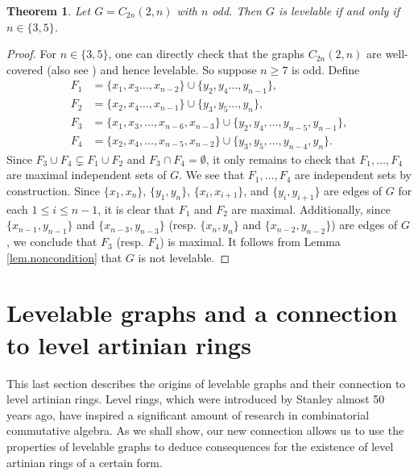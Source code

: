 \documentclass[12pt]{amsart}
\numberwithin{equation}{section}
\newtheorem{theorem}{Theorem}[section]
\theoremstyle{definition}
\newcounter{i} %
\begin{document}
\begin{theorem} \label{thm.circulant2}
Let $G=C_{2n}(2,n)$ with $n$ odd. Then $G$ is levelable if and only if $n \in \{3,5\}$.
\end{theorem}

\begin{proof}
For $n \in \{3,5\}$, one can directly check that the graphs $C_{2n}(2,n)$ are well-covered 
(also 
   see \cite[Theorem 4.3]{BH2011}) and hence levelable. So suppose $n\geq 7$ is odd. Define
    \begin{align*}
        F_1 &= \{x_1,x_3\dots,x_{n-2}\}  \cup \{y_2,y_4\dots, y_{n-1} \},  \\
        F_2 &= \{x_2,x_4\dots,x_{n-1}\}  \cup \{y_3,y_5\dots, y_{n} \}, \\
        F_3 &= \{ x_1,x_3,\dots,x_{n-6}, x_{n-3} \} \cup \{ y_2,y_4,\dots,y_{n-5}, y_{n-1} \}, \\
        F_4 &= \{x_2,x_4,\dots,x_{n-5}, x_{n-2} \} \cup \{ y_3,y_5,\dots,y_{n-4}, y_{n} \}.
    \end{align*}
    Since $F_3 \cup F_4 \subsetneq F_1 \cup F_2$ and $F_3 \cap F_4  =\emptyset$, it only remains to check that $F_1,\dots,F_4$ are maximal independent sets of $G$. We see that $F_1,\dots, F_4$ are independent sets by construction. Since $\{x_1,x_{n}\}$, $\{y_1,y_{n}\}$, $\{x_i,x_{i+1}\}$, and $\{y_i,y_{i+1}\}$  are edges of $G$ for each $1 \leq i \leq n-1$, it is clear that $F_1$ and $F_2$ are maximal. Additionally, since $\{x_{n-1},y_{n-1}\}$ and $\{x_{n-3},y_{n-3}\}$ (resp. $\{x_{n},y_{n}\}$ and $\{x_{n-2},y_{n-2}\}$) are edges of $G$, we conclude that $F_3$ (resp. $F_4$) is maximal. It follows from Lemma \ref{lem.noncondition} that $G$ is not levelable.
\end{proof}


\section{Levelable graphs and a connection to level artinian rings}
This last section describes the origins of levelable graphs and
their connection to level artinian rings.  Level rings, which 
were introduced by Stanley \cite{Stan77} almost 50 years ago,
have inspired a significant amount of research in 
combinatorial commutative algebra.
As we shall show, our new connection allows us to use
the properties of levelable graphs to deduce consequences
for the existence of level  artinian  rings of a certain form.
\end{document}
